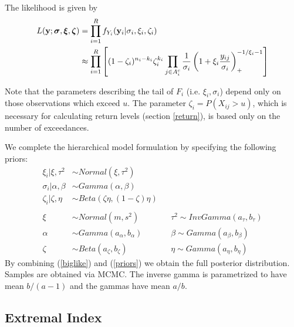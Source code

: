 The likelihood is given by
\begin{align}
L(\mathbf{\bm{y}}; \mathbf{\bm{\sigma}}, \mathbf{\bm{\xi}}, \mathbf{\bm{\zeta}}) &= \prod_{i=1}^R f_{Y_i}(\mathbf{\bm{y}}_i|\sigma_i,\xi_i,\zeta_i) \nonumber \\
&\approx \prod_{i=1}^R\left[(1-\zeta_i)^{n_i-k_i}\zeta_i^{k_i}\prod_{j\in A_i^c}\frac{1}{\sigma_i}\left(1+\xi_i\frac{y_{ij}}{\sigma_i}\right)_+^{-1/\xi_i-1}\right] \label{biglike}
\end{align}

Note that the parameters describing the tail of $F_i$ (i.e. $\xi_i,\sigma_i$) depend only on those observations which exceed $u$. The parameter $\zeta_i=P(X_{ij}>u)$, which is necessary for calculating return levels (section \ref{return}), is based only on the number of exceedances.

We complete the hierarchical model formulation by specifying the following priors:
\begin{align}
\xi_i|\xi, \tau^2  &\sim Normal(\xi, \tau^2) \nonumber \\
\sigma_i|\alpha, \beta &\sim Gamma(\alpha, \beta) \nonumber \\
\zeta_i|\zeta, \eta &\sim Beta(\zeta\eta, (1-\zeta)\eta) \nonumber \\
 \label{priors} \\
\xi &\sim Normal(m, s^2)&  &\tau^2 \sim InvGamma(a_\tau, b_\tau) \nonumber \\
\alpha &\sim Gamma(a_\alpha, b_\alpha)&  &\beta \sim Gamma(a_\beta, b_\beta) \nonumber \\
\zeta &\sim Beta(a_\zeta, b_\zeta)&  &\eta \sim Gamma(a_\eta, b_\eta) \nonumber
\end{align}
By combining (\ref{biglike}) and (\ref{priors}) we obtain the full posterior distribution. Samples are obtained via MCMC. The inverse gamma is parametrized to have mean $b/(a-1)$ and the gammas have mean $a/b$.


\subsection{Extremal Index}
\label{index}

